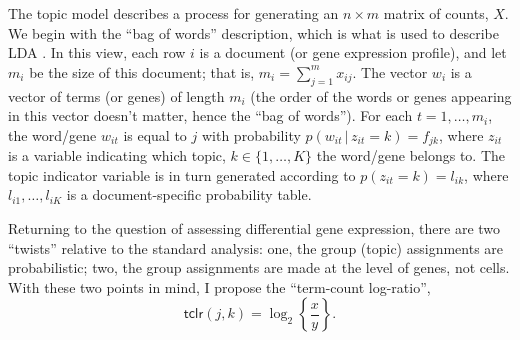 \documentclass[final]{siamart171218}
\begin{document}
The topic model describes a process for generating an $n \times m$
matrix of counts, $X$. We begin with the ``bag of words'' description,
which is what is used to describe LDA \cite{blei-2003}. In this view,
each row $i$ is a document (or gene expression profile), and let $m_i$
be the size of this document; that is, $m_i = \sum_{j=1}^m
x_{ij}$. The vector $w_i$ is a vector of terms (or genes) of length
$m_i$ (the order of the words or genes appearing in this vector
doesn't matter, hence the ``bag of words''). For each $t = 1, \ldots,
m_{i}$, the word/gene $w_{it}$ is equal to $j$ with probability
$p(w_{it} \,|\, z_{it} = k) = f_{jk}$, where $z_{it}$ is a variable
indicating which topic, $k \in \{1, \ldots, K\}$ the word/gene belongs
to. The topic indicator variable is in turn generated according to
$p(z_{it} = k) = l_{ik}$, where $l_{i1}, \ldots, l_{iK}$ is a
document-specific probability table.

Returning to the question of assessing differential gene expression,
there are two ``twists'' relative to the standard analysis: one, the
group (topic) assignments are probabilistic; two, the group
assignments are made at the level of genes, not cells. With these two
points in mind, I propose the ``term-count log-ratio'',
\begin{equation}
\mathsf{tclr}(j,k) = \log_2 \left\{ \frac{x}{y} \right\}.
\end{equation}



\end{document}
